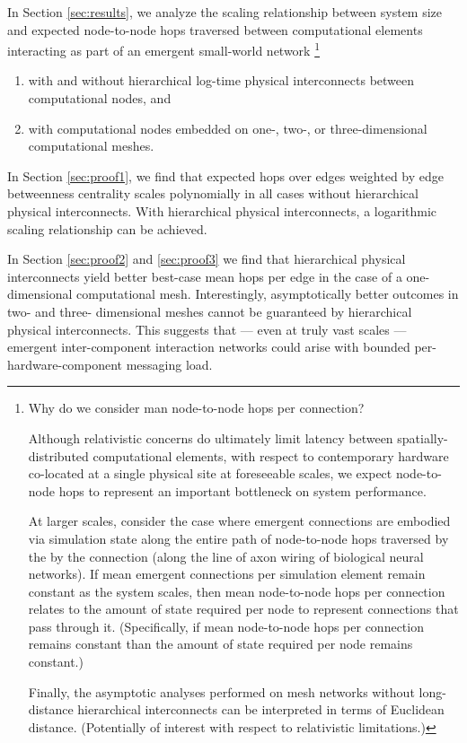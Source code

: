 In Section \ref{sec:results}, we analyze the scaling relationship between system size and expected node-to-node hops traversed between computational elements interacting as part of an emergent small-world network
\footnote{
Why do we consider man node-to-node hops per connection?

Although relativistic concerns do ultimately limit latency between spatially-distributed computational elements, with respect to contemporary hardware co-located at a single physical site at foreseeable scales, we expect node-to-node hops to represent an important bottleneck on system performance.

At larger scales, consider the case where emergent connections are embodied via simulation state along the entire path of node-to-node hops traversed by the by the connection (along the line of axon wiring of biological neural networks).
If mean emergent connections per simulation element remain constant as the system scales, then mean node-to-node hops per connection relates to the amount of state required per node to represent connections that pass through it.
(Specifically, if mean node-to-node hops per connection remains constant than the amount of state required per node remains constant.)

Finally, the asymptotic analyses performed on mesh networks without long-distance hierarchical interconnects can be interpreted in terms of Euclidean distance.
(Potentially of interest with respect to relativistic limitations.)
}
\begin{enumerate}
\item with and without hierarchical log-time physical interconnects between computational nodes, and
\item with computational nodes embedded on one-, two-, or three-dimensional computational meshes.
\end{enumerate}

In Section \ref{sec:proof1}, we find that expected hops over edges weighted by edge betweenness centrality scales polynomially in all cases without hierarchical physical interconnects.
With hierarchical physical interconnects, a logarithmic scaling relationship can be achieved.

In Section \ref{sec:proof2} and \ref{sec:proof3} we find that hierarchical physical interconnects yield better best-case mean hops per edge in the case of a one-dimensional computational mesh.
Interestingly, asymptotically better outcomes in two- and three- dimensional meshes cannot be guaranteed by hierarchical physical interconnects.
This suggests that --- even at truly vast scales --- emergent inter-component interaction networks could arise with bounded per-hardware-component messaging load.

